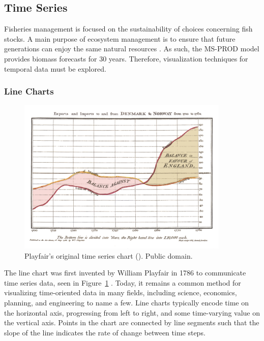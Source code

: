 \subsection{Time Series}

Fisheries management is focused on the sustainability of choices concerning fish stocks.  A main purpose of ecosystem management is to ensure that future generations can enjoy the same natural resources \cite{christensen1996}.  As such, the MS-PROD model provides biomass forecasts for 30 years.  Therefore, visualization techniques for temporal data must be explored.

\subsubsection{Line Charts}

\begin{figure}[h]
	\centering
	\includegraphics[width=0.9\textwidth]{figures/png/PlayfairTimeSeries.png}
	\caption[Playfair's original time series chart]{Playfair's original time series chart (\citeyear{playfair}).  Public domain.}
	\label{fig:playfair}
\end{figure}

The line chart was first invented by William Playfair in 1786 to communicate time series data, seen in Figure~\ref{fig:playfair} \cite{playfair}.  Today, it remains a common method for visualizing time-oriented data in many fields, including science, economics, planning, and engineering to name a few.  Line charts typically encode time on the horizontal axis, progressing from left to right, and some time-varying value on the vertical axis.  Points in the chart are connected by line segments such that the slope of the line indicates the rate of change between time steps.  

